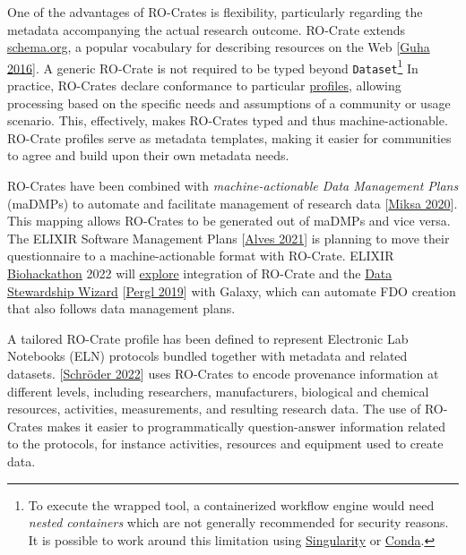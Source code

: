 One of the advantages of RO-Crates is flexibility, particularly
regarding the metadata accompanying the actual research outcome.
RO-Crate extends \href{https://schema.org/}{schema.org}, a popular
vocabulary for describing resources on the Web
{[}\href{https://doi.org/10.1145/2844544}{Guha 2016}{]}. A generic
RO-Crate is not required to be typed beyond \texttt{Dataset}\footnote{To
  execute the wrapped tool, a containerized workflow engine would need
  \emph{nested containers} which are not generally recommended for
  security reasons. It is possible to work around this limitation using
  \href{https://sylabs.io/singularity/}{Singularity} or
  \href{https://docs.bioexcel.eu/cwl-best-practice-guide/devpractice/containers/conda.html}{Conda}.}
In practice, RO-Crates declare conformance to particular
\href{https://www.researchobject.org/ro-crate/profiles.html}{profiles},
allowing processing based on the specific needs and assumptions of a
community or usage scenario. This, effectively, makes RO-Crates typed
and thus machine-actionable. RO-Crate profiles serve as metadata
templates, making it easier for communities to agree and build upon
their own metadata needs.

RO-Crates have been combined with \emph{machine-actionable Data
Management Plans} (maDMPs) to automate and facilitate management of
research data {[}\href{https://doi.org/10.4126/frl01-006423291}{Miksa
2020}{]}. This mapping allows RO-Crates to be generated out of maDMPs
and vice versa. The ELIXIR Software Management Plans
{[}\href{https://doi.org/10.37044/osf.io/k8znb}{Alves 2021}{]} is
planning to move their questionnaire to a machine-actionable format with
RO-Crate. ELIXIR \href{https://biohackathon-europe.org/}{Biohackathon}
2022 will
\href{https://github.com/elixir-europe/biohackathon-projects-2022/tree/main/10}{explore}
integration of RO-Crate and the \href{https://ds-wizard.org/}{Data
Stewardship Wizard} {[}\href{https://doi.org/10.5334/dsj-2019-059}{Pergl
2019}{]} with Galaxy, which can automate FDO creation that also follows
data management plans.

A tailored RO-Crate profile has been defined to represent Electronic Lab
Notebooks (ELN) protocols bundled together with metadata and related
datasets. {[}\href{https://doi.org/10.1186/s13326-021-00257-x}{Schröder
2022}{]} uses RO-Crates to encode provenance information at different
levels, including researchers, manufacturers, biological and chemical
resources, activities, measurements, and resulting research data. The
use of RO-Crates makes it easier to programmatically question-answer
information related to the protocols, for instance activities, resources
and equipment used to create data.

